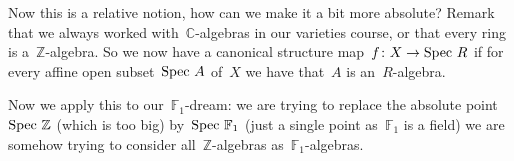 Now this is a relative notion, how can we make it a bit more absolute? Remark that we always worked with~$\mathbb{C}$\nobreakdash-algebras in our varieties course, or that every ring is a~$\mathbb{Z}$\nobreakdash-algebra. So we now have a canonical structure map~$f\colon X\to\operatorname{Spec\,} R$ if for every affine open subset~$\operatorname{Spec\,} A$ of~$X$ we have that~$A$ is an~$R$\nobreakdash-algebra.

Now we apply this to our~$\mathbb{F}_1$\nobreakdash-dream: we are trying to replace the absolute point~$\operatorname{Spec\,}\mathbb{Z}$ (which is too big) by~$\operatorname{Spec\,}\mathbb{F}_1$ (just a single point as~$\mathbb{F}_1$ is a field) we are somehow trying to consider all~$\mathbb{Z}$\nobreakdash-algebras as~$\mathbb{F}_1$\nobreakdash-algebras.

